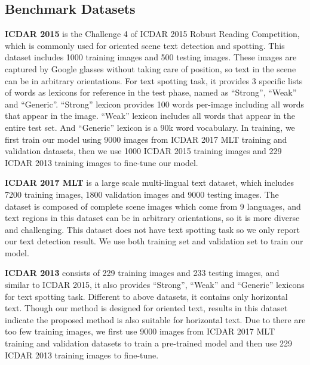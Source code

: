 \documentclass[10pt,twocolumn,letterpaper]{article}
\begin{document}
\subsection{Benchmark Datasets}

\textbf{ICDAR 2015} is the Challenge 4 of ICDAR 2015 Robust Reading Competition, which is commonly used for oriented scene text detection and spotting. This dataset includes 1000 training images and 500 testing images. These images are captured by Google glasses without taking care of position, so text in the scene can be in arbitrary orientations. For text spotting task, it provides 3 specific lists of words as lexicons for reference in the test phase, named as ``Strong'', ``Weak'' and ``Generic''. ``Strong'' lexicon provides 100 words per-image including all words that appear in the image. ``Weak'' lexicon includes all words that appear in the entire test set. And ``Generic'' lexicon is a 90k word vocabulary. In training, we first train our model using 9000 images from ICDAR 2017 MLT training and validation datasets, then we use 1000 ICDAR 2015 training images and 229 ICDAR 2013 training images to fine-tune our model.

\textbf{ICDAR 2017 MLT} is a large scale multi-lingual text dataset, which includes 7200 training images, 1800 validation images and 9000 testing images. The dataset is composed of complete scene images which come from 9 languages, and text regions in this dataset can be in arbitrary orientations, so it is more diverse and challenging. This dataset does not have text spotting task so we only report our text detection result. We use both training set and validation set to train our model.

\textbf{ICDAR 2013} consists of 229 training images and 233 testing images, and similar to ICDAR 2015, it also provides ``Strong'', ``Weak'' and ``Generic'' lexicons for text spotting task. Different to above datasets, it contains only horizontal text. Though our method is designed for oriented text, results in this dataset indicate the proposed method is also suitable for horizontal text. Due to there are too few training images, we first use 9000 images from ICDAR 2017 MLT training and validation datasets to train a pre-trained model and then use 229 ICDAR 2013 training images to fine-tune.
\end{document}
